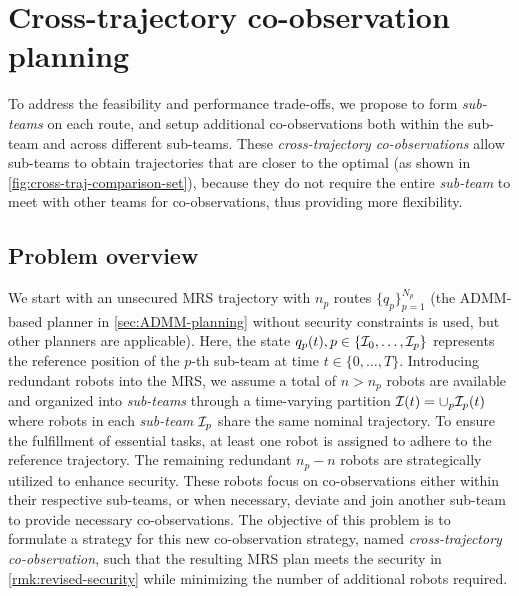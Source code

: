 \documentclass[10pt,twocolumn,twoside]{IEEEtran}
\begin{document}
\section{Cross-trajectory co-observation planning}\label{sec:cross-trajectory}
To address the feasibility and performance trade-offs, we propose to form \emph{sub-teams} on each route, and setup additional co-observations both within the sub-team and across different sub-teams. These \emph{cross-trajectory co-observations} allow sub-teams to obtain trajectories that are closer to the optimal (as shown in \cref{fig:cross-traj-comparison-set}), because they do not require the entire \emph{sub-team} to meet with other teams for co-observations, thus providing more flexibility.
\subsection{Problem overview}
We start with an unsecured MRS trajectory with $n_p$ routes $\{q_p\}_{p=1}^{N_p}$ (the ADMM-based planner in \cref{sec:ADMM-planning} without security constraints is used, but other planners are applicable). Here, the state $q_p(t), p \in\{\mathcal{I}_0,\ldots,\mathcal{I}_{p}\}$ represents the reference position of the $p$-th sub-team at time $t\in\{0, \dots, T\}$. Introducing redundant robots into the MRS, we assume a total of $n > n_p$ robots are available and organized into \emph{sub-teams} through a time-varying partition $\mathcal{I}(t)=\cup_p \mathcal{I}_p(t)$ where robots in each \emph{sub-team} $\mathcal{I}_p$ share the same nominal trajectory. To ensure the fulfillment of essential tasks, at least one robot is assigned to adhere to the reference trajectory. The remaining redundant $n_p-n$ robots are strategically utilized to enhance security. These robots focus on co-observations either within their respective sub-teams, or when necessary, deviate and join another sub-team to provide necessary co-observations. The objective of this problem is to formulate a strategy for this new co-observation strategy, named \emph{cross-trajectory co-observation}, such that the resulting MRS plan meets the security in \cref{rmk:revised-security} while minimizing the number of additional robots required. 
\end{document}
